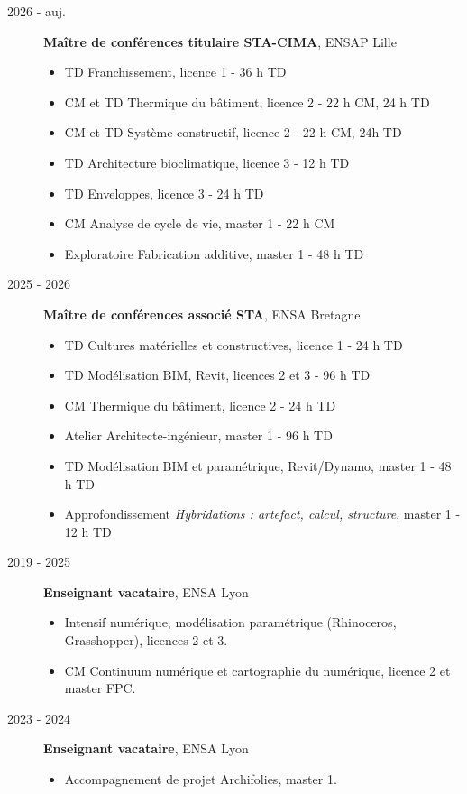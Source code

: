 \documentclass[11pt,a4paper]{article}
\begin{document}
\begin{description}
  \item[2026 - auj.] \textbf{Maître de conférences titulaire STA-CIMA}, ENSAP Lille
  \begin{itemize}
    \item TD Franchissement, licence 1 - 36 h TD
    \item CM et TD Thermique du bâtiment, licence 2 - 22 h CM, 24 h TD
    \item CM et TD Système constructif, licence 2 - 22 h CM, 24h TD
    \item TD Architecture bioclimatique, licence 3 - 12 h TD
    \item TD Enveloppes, licence 3 - 24 h TD
    \item CM Analyse de cycle de vie, master 1 - 22 h CM
    \item Exploratoire Fabrication additive, master 1 - 48 h TD
  \end{itemize}

  \item[2025 - 2026] \textbf{Maître de conférences associé STA}, ENSA Bretagne
  \begin{itemize}
    \item TD Cultures matérielles et constructives, licence 1 - 24 h TD
    \item TD Modélisation BIM, Revit, licences 2 et 3 - 96 h TD
    \item CM Thermique du bâtiment, licence 2 - 24 h TD
    \item Atelier Architecte-ingénieur, master 1 - 96 h TD
    \item TD Modélisation BIM et paramétrique, Revit/Dynamo, master 1 - 48 h TD
    \item Approfondissement \emph{Hybridations : artefact, calcul, structure}, master 1 - 12 h TD
  \end{itemize}

  \item[2019 - 2025] \textbf{Enseignant vacataire}, ENSA Lyon
  \begin{itemize}
    \item Intensif numérique, modélisation paramétrique (Rhinoceros, Grasshopper), licences 2 et 3.
    \item CM Continuum numérique et cartographie du numérique, licence 2 et master FPC.
  \end{itemize}

  \item[2023 - 2024] \textbf{Enseignant vacataire}, ENSA Lyon
  \begin{itemize}
    \item Accompagnement de projet Archifolies, master 1.
  \end{itemize}


\end{description}
\end{document}
